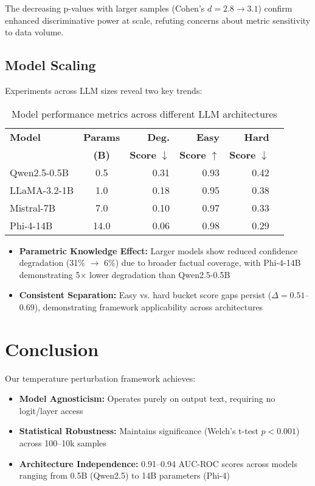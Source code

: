 \documentclass[sigconf]{acmart}
\begin{document}
The decreasing p-values with larger samples (Cohen's $d = 2.8 \rightarrow 3.1$) confirm enhanced discriminative power at scale, refuting concerns about metric sensitivity to data volume.

\subsection{Model Scaling}
Experiments across LLM sizes reveal two key trends:

\begin{table}[h]
\centering
\small
\setlength{\tabcolsep}{3pt}
\renewcommand{\arraystretch}{1.1}
\begin{tabular}{@{}lcrrrr@{}}
\hline
\textbf{Model} & \textbf{Params} & \textbf{Deg.} & \textbf{Easy} & \textbf{Hard} \\
 & \textbf{(B)} & \textbf{Score} $\downarrow$ & \textbf{Score} $\uparrow$ & \textbf{Score} $\downarrow$ \\
\hline
Qwen2.5-0.5B \cite{Qwen2.5} & 0.5 & 0.31 & 0.93 & 0.42 \\
LLaMA-3.2-1B \cite{llama_3.2} & 1.0 & 0.18 & 0.95 & 0.38 \\
Mistral-7B \cite{mistral_7b} & 7.0 & 0.10 & 0.97 & 0.33 \\
Phi-4-14B \cite{phi_4} & 14.0 & 0.06 & 0.98 & 0.29 \\
\hline
\end{tabular}
\caption{Model performance metrics across different LLM architectures}
\end{table}

\begin{itemize}
    \item \textbf{Parametric Knowledge Effect:} Larger models show reduced confidence degradation (31\% $\rightarrow$ 6\%) due to broader factual coverage, with Phi-4-14B demonstrating 5× lower degradation than Qwen2.5-0.5B
    \item \textbf{Consistent Separation:} Easy vs. hard bucket score gaps persist ($\Delta = 0.51$--$0.69$), demonstrating framework applicability across architectures
\end{itemize}


\section{Conclusion}


Our temperature perturbation framework achieves:
\begin{itemize}
    \item \textbf{Model Agnosticism:} Operates purely on output text, requiring no logit/layer access
    \item \textbf{Statistical Robustness:} Maintains significance (Welch's t-test $p < 0.001$) across 100--10k samples
    \item \textbf{Architecture Independence:} 0.91--0.94 AUC-ROC scores across models ranging from 0.5B (Qwen2.5) to 14B parameters (Phi-4)
\end{itemize}
\end{document}
